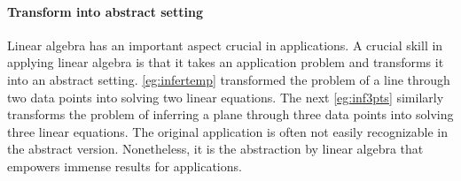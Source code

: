 \paragraph{Transform into abstract setting}
Linear algebra has an important aspect crucial in applications.
A crucial skill in applying linear algebra is that it takes an application problem and transforms it into an abstract setting.
\cref{eg:infertemp} transformed the problem of  a line through two data points into solving two linear equations.
The next \cref{eg:inf3pts} similarly transforms the problem of inferring a plane through three data points into solving three linear equations.
The original application is often not easily recognizable in the abstract version. 
Nonetheless, it is the abstraction by linear algebra that empowers immense results for applications.


